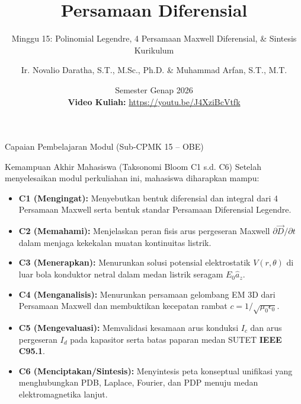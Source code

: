 \documentclass[aspectratio=169,10pt]{beamer}
\title[Persamaan Diferensial (Minggu 15)]{Persamaan Diferensial}
\subtitle{Minggu 15: Polinomial Legendre, 4 Persamaan Maxwell Diferensial, \& Sintesis Kurikulum}
\author[Novalio \& Arfan (UNIB)]{Ir. Novalio Daratha, S.T., M.Sc., Ph.D. \& Muhammad Arfan, S.T., M.T.}
\institute[Teknik Elektro UNIB]{Program Studi S1 Teknik Elektro, Jurusan Teknik Elektro \& Informatika\\Fakultas Teknik, Universitas Bengkulu}
\date[2026]{Semester Genap 2026 \\[1.5mm] {\scriptsize\color{red!85!black}\textbf{Video Kuliah:}} {\scriptsize\url{https://youtu.be/J4XziBcVtfk}} \quad \textbar \quad {\scriptsize\href{https://www.youtube.com/playlist?list=PLS5oOZWXZeTw}{\color{unibblue}\textbf{Playlist YouTube}}}}
\begin{document}
\begin{frame}[plain]
  \titlepage
\end{frame}

\begin{frame}{Capaian Pembelajaran Modul (Sub-CPMK 15 -- OBE)}
  \begin{block}{Kemampuan Akhir Mahasiswa (Taksonomi Bloom C1 s.d. C6)}
    Setelah menyelesaikan modul perkuliahan ini, mahasiswa diharapkan mampu:
    \begin{itemize}
      \item \textbf{C1 (Mengingat):} Menyebutkan bentuk diferensial dan integral dari 4 Persamaan Maxwell serta bentuk standar Persamaan Diferensial Legendre.
      \item \textbf{C2 (Memahami):} Menjelaskan peran fisis arus pergeseran Maxwell $\partial \vec{D}/\partial t$ dalam menjaga kekekalan muatan kontinuitas listrik.
      \item \textbf{C3 (Menerapkan):} Menurunkan solusi potensial elektrostatik $V(r, \theta)$ di luar bola konduktor netral dalam medan listrik seragam $E_0 \hat{a}_z$.
      \item \textbf{C4 (Menganalisis):} Menurunkan persamaan gelombang EM 3D dari Persamaan Maxwell dan membuktikan kecepatan rambat $c = 1/\sqrt{\mu_0 \epsilon_0}$.
      \item \textbf{C5 (Mengevaluasi):} Memvalidasi kesamaan arus konduksi $I_c$ dan arus pergeseran $I_d$ pada kapasitor serta batas paparan medan SUTET \textbf{IEEE C95.1}.
      \item \textbf{C6 (Menciptakan/Sintesis):} Menyintesis peta konseptual unifikasi yang menghubungkan PDB, Laplace, Fourier, dan PDP menuju medan elektromagnetika lanjut.
    \end{itemize}
  \end{block}
\end{frame}
\end{document}
